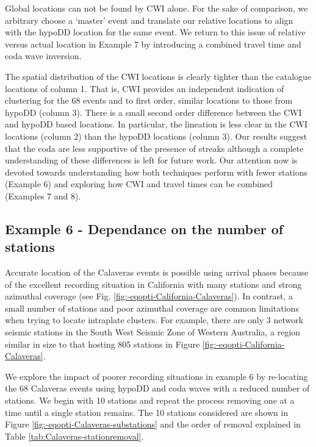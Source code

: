 \documentclass[extra, onecolumn, doublespacing]{gji}
\begin{document}
Global locations can not be found by CWI alone.
For the sake of comparison, we arbitrary choose a
`master' event and translate our relative locations to align with the hypoDD
location for the same event. We return to this issue of relative
versus actual location in Example 7 by introducing a combined travel
time and coda wave inversion.

The spatial distribution of the CWI locations is clearly tighter
than the catalogue locations of column 1. That is, CWI provides an
independent indication of clustering for the 68 events and to first
order, similar locations to those from hypoDD (column 3). There is a
small second order difference between the CWI and hypoDD based
locations. In particular, the lineation is less clear in the CWI
locations (column 2) than the hypoDD locations (column 3). Our
results suggest that the coda are less supportive of the presence of
streaks although a complete understanding of these differences is
left for future work. Our attention now is devoted towards
understanding how both techniques perform with fewer stations
(Example 6) and exploring how CWI and travel times can be combined
(Examples 7 and 8).


\subsection{Example 6 - Dependance on the number of stations}


Accurate location of the Calaveras events is possible using arrival
phases because of the excellent recording situation in California
with many stations and strong azimuthal coverage (see Fig.
\ref{fig:-eqopti-California-Calaveras}). In contrast, a small number
of stations and poor azimuthal coverage are common limitations when
trying to locate intraplate clusters. For example, there are only 3
network seismic stations in the South West Seismic Zone of Western
Australia, a region similar in size to that hosting 805 stations in
Figure \ref{fig:-eqopti-California-Calaveras}.

We explore the impact of poorer recording situations in example 6 by
re-locating the 68 Calaveras events  using hypoDD and coda waves
with a reduced number of stations. We begin with 10 stations and
repeat the process removing one at a time until a single station
remains. The 10 stations considered are shown in Figure
\ref{fig:-eqopti-Calaveras-substations} and the order of removal
explained in Table \ref{tab:Calaveras-stationremoval}.
\end{document}
